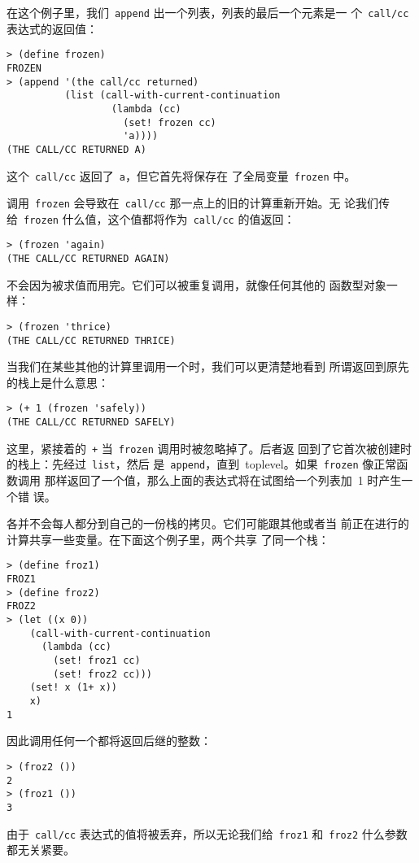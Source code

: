 在这个例子里，我们~\texttt{append} 出一个列表，列表的最后一个元素是一
个~\texttt{call/cc} 表达式的返回值：
\begin{lstlisting}
> (define frozen)
FROZEN
> (append '(the call/cc returned)
          (list (call-with-current-continuation
                  (lambda (cc)
                    (set! frozen cc)
                    'a))))
(THE CALL/CC RETURNED A)
\end{lstlisting}
这个~\texttt{call/cc} 返回了~\texttt{a}，但它首先将\continuation{}保存在
了全局变量~\texttt{frozen} 中。

调用~\texttt{frozen} 会导致在~\texttt{call/cc} 那一点上的旧的计算重新开始。无
论我们传给~\texttt{frozen} 什么值，这个值都将作为~\texttt{call/cc} 的值返回：
\begin{lstlisting}
> (frozen 'again)
(THE CALL/CC RETURNED AGAIN)
\end{lstlisting}
\continuation{}不会因为被求值而用完。它们可以被重复调用，就像任何其他的
函数型对象一样：
\begin{lstlisting}
> (frozen 'thrice)
(THE CALL/CC RETURNED THRICE)
\end{lstlisting}

当我们在某些其他的计算里调用一个\continuation{}时，我们可以更清楚地看到
所谓返回到原先的栈上是什么意思：
\begin{lstlisting}
> (+ 1 (frozen 'safely))
(THE CALL/CC RETURNED SAFELY)
\end{lstlisting}
这里，紧接着的~\texttt{+} 当~\texttt{frozen} 调用时被忽略掉了。后者返
回到了它首次被创建时的栈上：先经过~\texttt{list}，然后
是~\texttt{append}，直到~toplevel。如果~\texttt{frozen} 像正常函数调用
那样返回了一个值，那么上面的表达式将在试图给一个列表加~1 时产生一个错
误。

各\continuation{}并不会每人都分到自己的一份栈的拷贝\label{share-between-continuations}。它们可能跟其他\continuation{}或者当
前正在进行的计算共享一些变量。在下面这个例子里，两个\continuation{}共享
了同一个栈：
\begin{lstlisting}
> (define froz1)
FROZ1
> (define froz2)
FROZ2
> (let ((x 0))
    (call-with-current-continuation
      (lambda (cc)
        (set! froz1 cc)
        (set! froz2 cc)))
    (set! x (1+ x))
    x)
1
\end{lstlisting}
因此调用任何一个都将返回后继的整数：
\begin{lstlisting}
> (froz2 ())
2
> (froz1 ())
3
\end{lstlisting}
由于~\texttt{call/cc} 表达式的值将被丢弃，所以无论我们给~\texttt{froz1}
和~\texttt{froz2} 什么参数都无关紧要。


